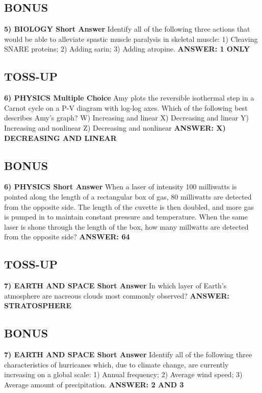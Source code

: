 \documentclass{article}
\begin{document}
\subsection*{BONUS}
\textbf{5) BIOLOGY Short Answer} Identify all of the following three actions that would be able to alleviate spastic muscle paralysis in skeletal muscle: 1) Cleaving SNARE proteins; 2) Adding sarin; 3) Adding atropine.
\textbf{ANSWER: 1 ONLY}

\newpage

\subsection*{TOSS-UP}
\textbf{6) PHYSICS Multiple Choice} Amy plots the reversible isothermal step in a Carnot cycle on a P-V diagram with log-log axes. Which of the following best describes Amy's graph?
W) Increasing and linear
X) Decreasing and linear
Y) Increasing and nonlinear
Z) Decreasing and nonlinear
\textbf{ANSWER: X) DECREASING AND LINEAR}

\subsection*{BONUS}
\textbf{6) PHYSICS Short Answer} When a laser of intensity 100 milliwatts is pointed along the length of a rectangular box of gas, 80 milliwatts are detected from the opposite side. The length of the cuvette is then doubled, and more gas is pumped in to maintain constant pressure and temperature. When the same laser is shone through the length of the box, how many millwatts are detected from the opposite side?
\textbf{ANSWER: 64}

\subsection*{TOSS-UP}
\textbf{7) EARTH AND SPACE Short Answer} In which layer of Earth's atmosphere are nacreous clouds most commonly observed?
\textbf{ANSWER: STRATOSPHERE}

\subsection*{BONUS}
\textbf{7) EARTH AND SPACE Short Answer} Identify all of the following three characteristics of hurricanes which, due to climate change, are currently increasing on a global scale: 1) Annual frequency; 2) Average wind speed; 3) Average amount of precipitation.
\textbf{ANSWER: 2 AND 3}
\end{document}
